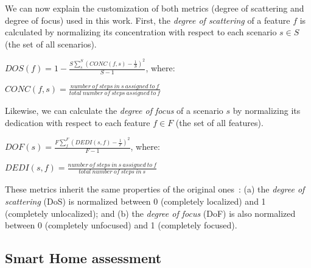 \documentclass{acm_proc_article-sp}
\begin{document}

We can now explain the customization of both metrics (degree of scattering and degree of focus) used in this work. First, the \emph{degree of scattering} of a feature $f$ is
calculated by normalizing its concentration with respect to each scenario $s \in
S$ (the set of all scenarios).

\begin{center}
$DOS(f) = 1 - \frac{S \sum_{s}^{S}(CONC(f,s)-\frac{1}{S})^2}{S-1}$, where:

$CONC(f,s) = \frac{number\ of\ steps\ in\ s\ assigned\ to\ f}{total\ number\
of\ steps\ assigned\ to\ f}$
\end{center}

Likewise, we can calculate the \emph{degree of focus} of a scenario $s$ by
normalizing its dedication with respect to each feature $f \in F$ (the set of
all features).

\begin{center}
$DOF(s) = \frac{F \sum_{f}^{F}(DEDI(s,f)-\frac{1}{F})^2}{F-1}$, where:

$DEDI(s,f) = \frac{number\ of\ steps\ in\ s\ assigned\ to\ f}{total\ number\
of\ steps\ in\ s}$
\end{center}

These metrics inherit the same properties of the original
ones~\cite{Eaddy:2007aa}: (a) the
\emph{degree of scattering} (DoS) is normalized between 0 (completely localized)
and 1 (completely unlocalized); and (b) the \emph{degree of focus} (DoF) is also
normalized between 0 (completely unfocused) and 1 (completely focused).


\subsection{Smart Home assessment}
\end{document}
